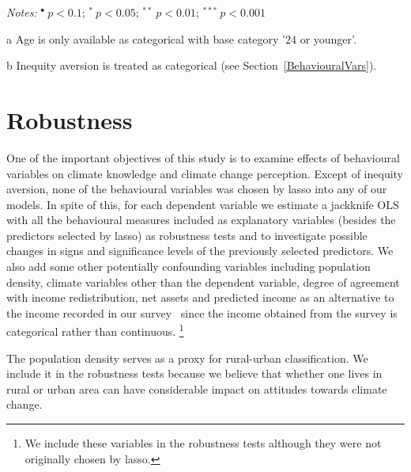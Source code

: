 \documentclass[a4paper,12pt]{article}
\begin{document}
{\begin{threeparttable}
\begin{small}
\begin{tabular}{lrcrc}
\hline
\end{tabular} 
\end{small}
 \begin{tablenotes}
  \begin{footnotesize}
  \item \textit{Notes:} \hspace{0.2cm}$^{\bullet}~p<0.1$; $^{*}~p<0.05$; $^{**}~p<0.01$; $^{***}~p<0.001$
  \begin{adjustwidth}{1cm}{}\item[a]Age is only available as categorical with  base category '$24$ or younger'.
\item[b]Inequity aversion is treated as categorical (see Section~\ref{BehaviouralVars}).
     \end{adjustwidth}
\singlespacing
  \end{footnotesize}
\end{tablenotes}
  \end{threeparttable} 
\par}




\newpage




\FloatBarrier
\section{Robustness}\label{Robust}


One of the important objectives of this study is to examine effects of behavioural variables on climate knowledge and climate change perception. Except of inequity aversion, none of the behavioural variables was chosen by lasso into any of our models. In spite of this, for each dependent variable we estimate a jackknife OLS with all the behavioural measures included as explanatory variables (besides the predictors selected by lasso) as robustness tests and to investigate possible changes in signs and significance levels of the previously
selected predictors.  We also add some other potentially confounding variables including population density, climate variables other than the dependent variable, degree of agreement with income redistribution, net assets and predicted income as an alternative to the income recorded in our survey~\citep{SurveyUK} since the income obtained from the survey is categorical rather than continuous. \footnote{We include these variables in the robustness tests although they were not originally chosen by lasso.}

The population density serves as a proxy for rural-urban classification. We include it in the robustness tests because we believe that whether one lives in rural or urban area can have considerable impact on attitudes towards climate change.
\end{document}
